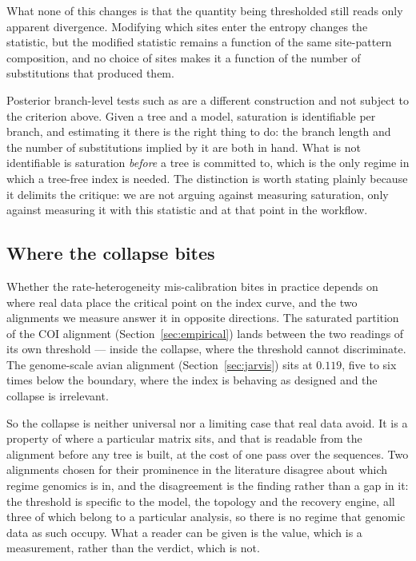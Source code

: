 \documentclass[11pt]{article}
\theoremstyle{definition}
\theoremstyle{remark}
\begin{document}
What none of this changes is that the quantity being thresholded still reads
only apparent divergence. Modifying which sites enter the entropy changes the
statistic, but the modified statistic remains a function of the same
site-pattern composition, and no choice of sites makes it a function of the
number of substitutions that produced them.

Posterior branch-level tests such as \citet{manuel2025satute} are a different
construction and not subject to the criterion above. Given a tree and a model,
saturation is identifiable per branch, and estimating it there is the right
thing to do: the branch length and the number of substitutions implied by it
are both in hand. What is not identifiable is saturation \emph{before} a tree
is committed to, which is the only regime in which a tree-free index is
needed. The distinction is worth stating plainly because it delimits the
critique: we are not arguing against measuring saturation, only against
measuring it with this statistic and at that point in the workflow.

\subsection{Where the collapse bites}
\label{sec:open}

Whether the rate-heterogeneity mis-calibration bites in practice depends on
where real data place the critical point on the index curve, and the two
alignments we measure answer it in opposite directions. The saturated
partition of the COI alignment
(Section~\ref{sec:empirical}) lands between the two readings of its own
threshold --- inside the collapse, where the threshold cannot discriminate. The
genome-scale avian alignment
(Section~\ref{sec:jarvis}) sits at $0.119$, five to six times below the
boundary, where the index is behaving as designed and the collapse is
irrelevant.

So the collapse is neither universal nor a limiting case that real data
avoid. It is a property of where a particular matrix sits, and that is
readable from the alignment before any tree is built, at the cost of one pass
over the sequences. Two alignments chosen for their prominence in the
literature disagree about which regime genomics is in, and the disagreement
is the finding rather than a gap in it: the threshold is specific to the
model, the topology and the recovery engine, all three of which belong to a
particular analysis, so there is no regime that genomic data as such occupy.
What a reader can be given is the value, which is a measurement, rather than
the verdict, which is not.
\end{document}

